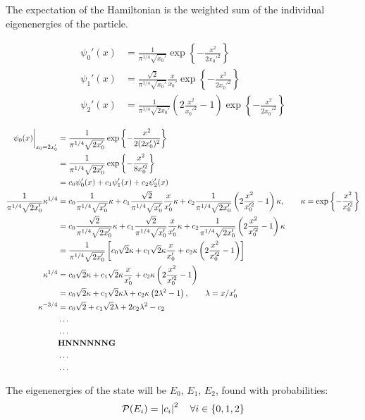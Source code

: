 \documentclass[12pt]{article}
\begin{document}
The expectation of the Hamiltonian is the weighted sum of the individual eigenenergies of the particle.

\problemasub
\begin{align*}
\psi_0'(x) &= \frac{1}{\pi^{1/4}\sqrt{x_0'}}\exp\left\{-\frac{x^2}{2x_0'^2}\right\} \\
\psi_1'(x) &= \frac{\sqrt{2}}{\pi^{1/4}\sqrt{x_0'}}\frac{x}{x_0'}\exp\left\{-\frac{x^2}{2x_0'^2}\right\} \\
\psi_2'(x) &= \frac{1}{\pi^{1/4}\sqrt{2x_0'}}\left( 2\frac{x^2}{x_0'^2} -1\right)\exp\left\{-\frac{x^2}{2x_0'^2}\right\}
\end{align*}

\begin{align*}
\psi_0(x)\biggr|_{x_0 = 2x_0'} &= \frac{1}{\pi^{1/4}\sqrt{2x_0'}}\exp\left\{-\frac{x^2}{2(2x_0')^2}\right\} \\
&= \frac{1}{\pi^{1/4}\sqrt{2x_0'}}\exp\left\{-\frac{x^2}{8x_0'^2}\right\} \\
&= c_0 \psi_0'(x) + c_1 \psi_1'(x) + c_2 \psi_2'(x)
\\
\frac{1}{\pi^{1/4}\sqrt{2x_0'}}\kappa^{1/4} &=
c_0 \frac{1}{\pi^{1/4}\sqrt{x_0'}}\kappa + 
c_1 \frac{\sqrt{2}}{\pi^{1/4}\sqrt{x_0'}}\frac{x}{x_0'}\kappa + 
c_2 \frac{1}{\pi^{1/4}\sqrt{2x_0'}}\left( 2\frac{x^2}{x_0'^2} -1\right)\kappa, \qquad \kappa = \exp\left\{-\frac{x^2}{x_0'^2}\right\}
\\
&=
c_0 \frac{\sqrt{2}}{\pi^{1/4}\sqrt{2x_0'}}\kappa + 
c_1 \frac{\sqrt{2}}{\pi^{1/4}\sqrt{x_0'}}\frac{x}{x_0'}\kappa + 
c_2 \frac{1}{\pi^{1/4}\sqrt{2x_0'}}\left( 2\frac{x^2}{x_0'^2} -1\right)\kappa
\\
&=
\frac{1}{\pi^{1/4}\sqrt{2x_0'}} \left[
c_0\sqrt{2}\kappa + c_1\sqrt{2}\kappa\frac{x}{x_0'} + c_2\kappa\left(2\frac{x^2}{x_0'^2}-1\right)
\right]
\\
\kappa^{1/4} &= c_0\sqrt{2}\kappa + c_1\sqrt{2}\kappa\frac{x}{x_0'} + c_2\kappa\left(2\frac{x^2}{x_0'^2}-1\right) \\
&= c_0\sqrt{2}\kappa + c_1\sqrt{2}\kappa\lambda + c_2\kappa\left(2\lambda^2-1\right), \qquad \lambda = x/x_0' \\
\kappa^{-3/4} &= c_0\sqrt{2} + c_1\sqrt{2}\lambda + 2c_2\lambda^2-c_2 \\
&\dots\\
&\dots\\
&\text{\textbf{HNNNNNNG}}\\
&\dots\\
&\dots
\end{align*}


\problemasub

The eigenenergies of the state will be $E_0$, $E_1$, $E_2$, found with probabilities: $$\mathcal{P}(E_i) = \left|c_i\right|^2 \quad \forall i \in \{0,1,2\}$$
\end{document}
